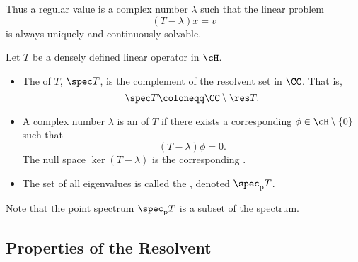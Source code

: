 \documentclass[oneside,reqno,letterpaper]{amsart}
\newcommand{\pspec}{\spec_{\mathrm{p}}}
\begin{document}
Thus a regular value is a complex number \(\lambda\) such that the linear problem 
\[
  (T - \lambda) x = v
\]
is always uniquely and continuously solvable. 


\begin{definition}
  Let \(T\) be a densely defined linear operator in \(\cH\). 
  \begin{itemize}
    \item The  of \(T\), \(\spec T\), is the complement of the resolvent set in \(\CC\). 
      That is, 
      \[
        \spec T \coloneqq \CC \setminus \res T . 
      \]
    \item A complex number \(\lambda\) is an  of \(T\) if there exists a corresponding  \(\phi \in \cH \setminus \{0\}\) such that 
      \[
        (T - \lambda) \phi = 0 . 
      \] 
      The null space \(\ker(T - \lambda)\) is the corresponding . 
    \item The set of all eigenvalues is called the , denoted \(\pspec T\). 
  \end{itemize}
\end{definition}
Note that the point spectrum \(\pspec T\) is a subset of the spectrum. 


\subsection{Properties of the Resolvent}
\end{document}
